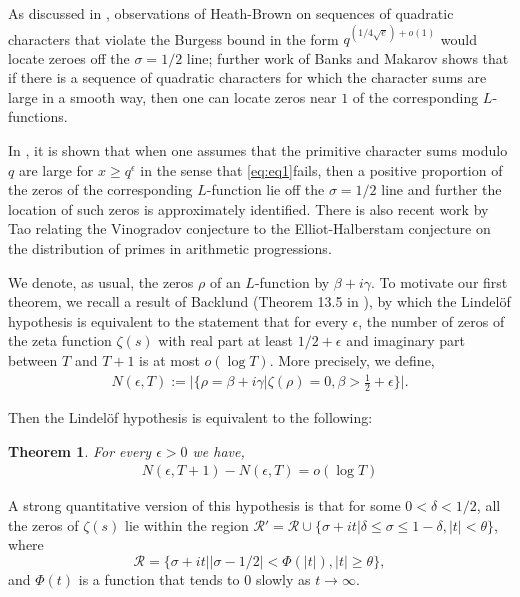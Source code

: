 \documentclass[letter,12pt]{article}
\newcounter{conj}
\theoremstyle{plain}
\newtheorem{theorem}{Theorem}
\theoremstyle{definition}
\theoremstyle{plain}
\newcommand{\eps}{\epsilon}
\begin{document}
As discussed in \cite{Sound}, observations of Heath-Brown on sequences of quadratic characters that violate the Burgess bound\cite{Bur0} in the form $q^{(1/4\sqrt{e}) +o(1)}$ would locate zeroes off the $\sigma=1/2$ line; further work of Banks and Makarov\cite{Banks} shows that if there is a sequence of quadratic characters for which the character sums are large in a smooth way, then one can locate zeros near $1$ of the corresponding $L$-functions.

In \cite{Sound}, it is shown that when one assumes that the primitive character sums modulo $q$ are large for $x\geq q^{\eps}$ in the sense that \cref{eq:eq1}fails, then a positive proportion of the zeros of the corresponding $L$-function lie off the $\sigma=1/2$ line and further the location of such zeros is approximately identified. There is also recent work by Tao \cite{Tao} relating the Vinogradov conjecture to the Elliot-Halberstam conjecture on the distribution of primes in arithmetic progressions.


We denote, as usual, the zeros $\rho$ of an $L$-function by $\beta+i\gamma$.  To motivate our first theorem, we recall a result of Backlund (Theorem 13.5 in \cite{Tit}), by which the Lindel\"{o}f hypothesis is equivalent to the statement that for every $\eps$, the number of zeros of the zeta function $\zeta(s)$ with real part at least $1/2 +\eps$ and imaginary part between $T$ and $T+1$ is at most $o(\log T)$. More precisely, we define,
\begin{align*}N(\eps,T):=|\{ \rho=\beta +i\gamma|\zeta(\rho)=0, \beta> \frac{1}{2} +\eps \}|.\end{align*}

Then the Lindel\"{o}f hypothesis is equivalent to the following:
\begin{theorem}
    For every $\eps>0$ we have, 
    \begin{align}
        N(\eps,T+1)-N(\eps, T)=o(\log T)
    \end{align}
\end{theorem}


A strong quantitative version of this hypothesis is that for some $0<\delta<1/2$, all the zeros of $\zeta(s)$ lie within the region $\mathcal{R}'=\mathcal{R}\cup \{\sigma+it| \delta\leq \sigma\leq 1-\delta, |t|<\theta \}$, where
\begin{equation}\label{eq;eq1}
\mathcal{R}=\{\sigma+it||\sigma -1/2|<\Phi(|t|), |t|\geq \theta\},
\end{equation}
 and $\Phi(t)$ is a function that tends to $0$ slowly as $t\to \infty$. 
\end{document}
